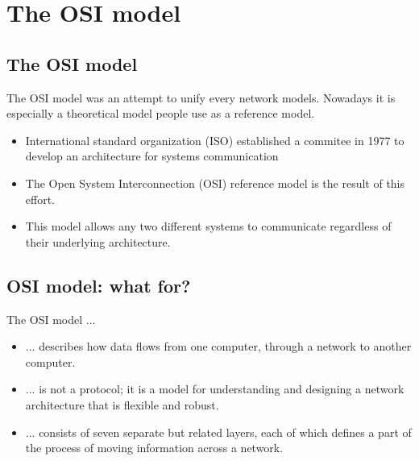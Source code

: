 \documentclass{beamer}[10pt, usepdftitle=false, handout]
\begin{document}
	\section{The OSI model}

	\subsection{The OSI model}
	
	\begin{frame}
	
	The OSI model was an attempt to unify every network models. Nowadays it is especially a theoretical model people use as a reference model. 
	\vspace*{1em}
	
	\begin{itemize}
	\item{International standard organization (ISO) established a commitee in 1977 to develop an architecture for systems communication}
	\item{The Open System Interconnection (OSI) reference model is the result of this effort.}
	\item{This model allows any two different systems to communicate regardless of their underlying architecture.}
	
	\end{itemize}
	
	\end{frame}
	
	\subsection{OSI model: what for?}
	
	\begin{frame}
	
	The OSI model ...	
	\vspace*{1em}	
	
	\begin{itemize}
	\item{... describes how data flows from one computer, through a network to another computer.}	
	\item{... is not a protocol; it is a model for understanding and designing a network architecture that is flexible and robust.}
	\item{... consists of seven separate but related layers, each of which defines a part of the process of moving information across a network.}
	\end{itemize}		
	
	\end{frame}
	
\end{document}
